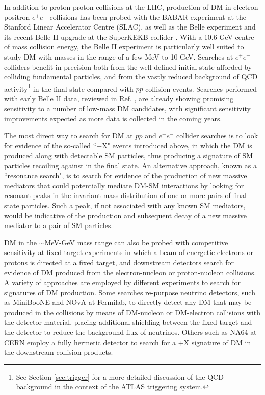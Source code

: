 In addition to proton-proton collisions at the LHC, production of DM in electron-positron \(e^+e^-\) collisions has been probed with the BABAR experiment \cite{babar_2002} at the Stanford Linear Accelerator Centre (SLAC), as well as the Belle experiment \cite{belle_detector_2002} and its recent Belle II upgrade \cite{belle_II_2018} at the SuperKEKB collider \cite{superkekb_2018}. With a 10.6 GeV centre of mass collision energy, the Belle II experiment is particularly well suited to study DM with masses in the range of a few MeV to 10 GeV. Searches at \(e^+e^-\) colliders benefit in precision both from the well-defined initial state afforded by colliding fundamental particles, and from the vastly reduced background of QCD activity\footnote{See Section \ref{sec:trigger} for a more detailed discussion of the QCD background in the context of the ATLAS triggering system.} in the final state compared with \(pp\) collision events. Searches performed with early Belle II data, reviewed in Ref. \cite{Campajola_2021}, are already showing promising sensitivity to a number of low-mass DM candidates, with significant sensitivity improvements expected as more data is collected in the coming years.

The most direct way to search for DM at \(pp\) and \(e^+e^-\) collider searches is to look for evidence of the so-called ``\met+X" events introduced above, in which the DM is produced along with detectable SM particles, thus producing a signature of SM particles recoiling against \met in the final state. An alternative approach, known as a ``resonance search", is to search for evidence of the production of new massive mediators that could potentially mediate DM-SM interactions by looking for resonant peaks in the invariant mass distribution of one or more pairs of final-state particles. Such a peak, if not associated with any known SM mediators, would be indicative of the production and subsequent decay of a new massive mediator to a pair of SM particles.

DM in the \(\sim\)MeV-GeV mass range can also be probed with competitive sensitivity at fixed-target experiments in which a beam of energetic electrons or protons is directed at a fixed target, and downstream detectors search for evidence of DM produced from the electron-nucleon or proton-nucleon collisions. A variety of approaches are employed by different experiments to search for signatures of DM production. Some searches re-purpose neutrino detectors, such as MiniBooNE \cite{miniboone_2018} and NOvA \cite{nova_2017} at Fermilab, to directly detect any DM that may be produced in the collisions by means of DM-nucleon or DM-electron collisions with the detector material, placing additional shielding between the fixed target and the detector to reduce the background flux of neutrinos. Others such as NA64 \cite{na64_2019} at CERN employ a fully hermetic detector to search for a \met+X signature of DM in the downstream collision products.

